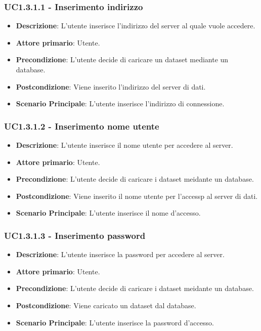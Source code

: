 \subsubsection{UC1.3.1.1 - Inserimento indirizzo}
\label{ssub:UC1.3.1.1}
\begin{itemize}
    \item \textbf{Descrizione}: L'utente inserisce l'indirizzo del server al quale vuole accedere.
    \item \textbf{Attore primario}: Utente.    
   
    \item \textbf{Precondizione}:   L'utente decide di caricare un dataset mediante un database.
    \item \textbf{Postcondizione}:  Viene inserito l'indirizzo del server di dati.
    
    \item \textbf{Scenario Principale}: L'utente inserisce l'indirizzo di connessione.

\end{itemize}


\subsubsection{UC1.3.1.2 - Inserimento nome utente}
\label{ssub:UC1.3.1.2}
\begin{itemize}
    \item \textbf{Descrizione}: L'utente inserisce il nome utente per accedere al server.
    \item \textbf{Attore primario}: Utente.
    
    \item \textbf{Precondizione}:   L'utente decide di caricare i dataset meidante un database.
    \item \textbf{Postcondizione}:  Viene inserito il nome utente per l'accessp al server di dati.

    \item \textbf{Scenario Principale}: L'utente inserisce il nome d'accesso.
\end{itemize}


\subsubsection{UC1.3.1.3 - Inserimento password}
\label{ssub:UC1.3.1.3}
\begin{itemize}
    \item \textbf{Descrizione}: L'utente inserisce la password per accedere al server.
    \item \textbf{Attore primario}: Utente.
    
    \item \textbf{Precondizione}:   L'utente decide di caricare i dataset meidante un database.
    \item \textbf{Postcondizione}:  Viene caricato un dataset dal database.

    \item \textbf{Scenario Principale}: L'utente inserisce la password d'accesso.

\end{itemize}


